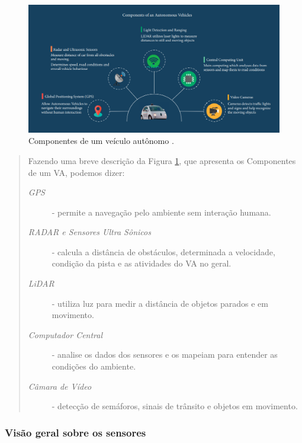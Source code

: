 \begin{figure}[H]
\centering
\includegraphics[width=\textwidth]{Figures/compo.png}
\caption{Componentes de um veículo autônomo \cite{aplicacao2}.}
\label{figura_compone}
\end{figure}

\begin{quote}
Fazendo uma breve descrição da Figura \ref{figura_compone}, que apresenta os Componentes de um VA, podemos dizer: 
\begin{description}
\item[\textit{GPS}] - permite a navegação pelo ambiente sem interação humana. 
\item[\textit{RADAR e Sensores Ultra Sônicos}] - calcula a distância de obstáculos, determinada a velocidade, condição da pista e as atividades do VA no geral. 
\item[\textit{LiDAR}] - utiliza luz para medir a distância de objetos parados e em movimento. 
\item[\textit{Computador Central}] - analise os dados dos sensores e os mapeiam para entender as condições do ambiente.
\item[\textit{Câmara de Vídeo}] - detecção de semáforos, sinais de trânsito e objetos em movimento.    
\end{description}
\end{quote}

\subsubsection{Visão geral sobre os sensores} \label{sensores}

